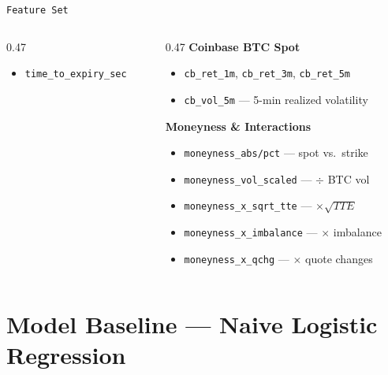 \documentclass[english, xcolor=dvipsnames, aspectratio=169]{beamer}
\newcommand{\sectiontitle}{}
\begin{document}
\begin{frame}{\texttt{Feature Set}}
\begin{columns}[T]
\begin{column}{0.47\textwidth}
\begin{itemize}
            \item \texttt{time\_to\_expiry\_sec}
        \end{itemize}
    \end{column}
    \begin{column}{0.47\textwidth}
        \textbf{Coinbase BTC Spot}
        \begin{itemize}
            \item \texttt{cb\_ret\_1m}, \texttt{cb\_ret\_3m}, \texttt{cb\_ret\_5m}
            \item \texttt{cb\_vol\_5m} --- 5-min realized volatility
        \end{itemize}
        \vspace{0.05cm}
        \textbf{Moneyness \& Interactions}
        \begin{itemize}
            \item \texttt{moneyness\_abs/pct} --- spot vs.\ strike
            \item \texttt{moneyness\_vol\_scaled} --- $\div$ BTC vol
            \item \texttt{moneyness\_x\_sqrt\_tte} --- $\times\sqrt{TTE}$
            \item \texttt{moneyness\_x\_imbalance} --- $\times$ imbalance
            \item \texttt{moneyness\_x\_qchg} --- $\times$ quote changes
        \end{itemize}
        \vspace{0.1cm}
    \end{column}
\end{columns}
\end{frame}

\renewcommand{\sectiontitle}{Model Baseline --- Naive Logistic Regression}
\section{\sectiontitle}
\end{document}
